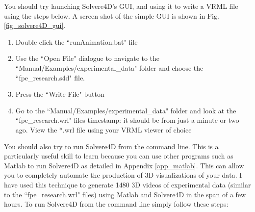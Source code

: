 \documentclass[singlecolumn,12pt]{article}
\begin{document}
You should try launching Solvere4D's GUI, and using it to write a
VRML file using the steps below. A screen shot of the simple GUI is
shown in Fig. \ref{fig_solvere4D_gui}.

\begin{enumerate}
\item Double click the ``runAnimation.bat" file
\item Use the ``Open File" dialogue to navigate to the
``Manual/Examples/experimental\_data" folder and choose the
``fpe\_research.s4d" file.
\item Press the ``Write File" button
\item Go to the ``Manual/Examples/experimental\_data" folder and
look at the ``fpe\_research.wrl" files timestamp: it should be from
just a minute or two ago. View the *.wrl file using your VRML viewer
of choice
\end{enumerate}

You should also try to run Solvere4D from the command line. This is
a particularly useful skill to learn because you can use other
programs such as Matlab to run Solvere4D as detailed in Appendix
\ref{app_matlab}. This can allow you to completely automate the
production of 3D visualizations of your data. I have used this
technique to generate 1480 3D videos of experimental data (similar
to the ``fpe\_research.wrl" files) using Matlab and Solvere4D in the
span of a few hours. To run Solvere4D from the command line simply
follow these steps:
\end{document}
